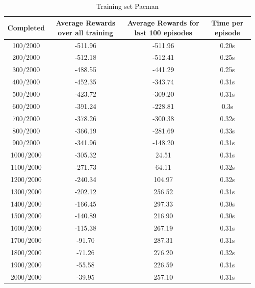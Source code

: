 \documentclass{article}
\begin{document}
~\\
\begin{table}[!ht]
  \begin{center}
    \begin{tabular}{||c||c|c|c||}
      \hline
      Completed & Average Rewards over all training & Average Rewards for last 100 episodes & Time per episode\\
      \hline\hline
      100/2000 & -511.96 & -511.96 & 0.20s \\
      \hline\hline
      200/2000 & -512.18 & -512.41 & 0.25s \\
      \hline
      300/2000 & -488.55 & -441.29 & 0.25s \\
      \hline
      400/2000 & -452.35 & -343.74 & 0.31s \\
      \hline
      500/2000 & -423.72 & -309.20 & 0.31s \\
      \hline
      600/2000 & -391.24 & -228.81 & 0.3s \\
      \hline
      700/2000 & -378.26 & -300.38 & 0.32s \\
      \hline
      800/2000 & -366.19 & -281.69 & 0.33s \\
      \hline
      900/2000 & -341.96 & -148.20 & 0.31s \\
      \hline
      1000/2000 & -305.32 & 24.51 & 0.31s \\
      \hline
      1100/2000 & -271.73 & 64.11 & 0.32s \\
      \hline
      1200/2000 & -240.34 & 104.97 & 0.32s \\
      \hline
      1300/2000 & -202.12 & 256.52 & 0.31s \\
      \hline
      1400/2000 & -166.45 & 297.33 & 0.30s \\
      \hline
      1500/2000 & -140.89 & 216.90 & 0.30s \\
      \hline
      1600/2000 & -115.38 & 267.19 & 0.31s \\
      \hline
      1700/2000 & -91.70 & 287.31 & 0.31s \\
      \hline
      1800/2000 & -71.26 & 276.20 & 0.32s \\
      \hline
      1900/2000 & -55.58 & 226.59 & 0.31s \\
      \hline
      2000/2000 & -39.95 & 257.10 & 0.31s \\
      \hline
    \end{tabular}
    \caption{Training set Pacman}
    \label{tab:trainPac}
  \end{center}
\end{table}
\end{document}

